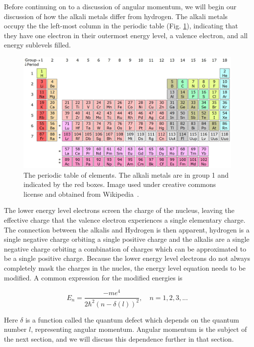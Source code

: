 \documentclass[12pt]{article}
\begin{document}
		Before continuing on to a discussion of angular momentum, 
		we will begin our discussion of how the alkali metals differ
		from hydrogen. The alkali metals occupy the the left-most
		column in the periodic table (Fig. \ref{periodicTable}), 
		indicating that they have one
		electron in their outermost energy level, a valence electron,
		and all energy sublevels filled. 
		\begin{figure}[ht]
			\centering
			\includegraphics[width=\textwidth]{periodicTable}
			\caption{\label{periodicTable}The periodic table 
				of elements. The alkali metals 
			are in group 1 and indicated by the red boxes. Image
			used under creative commons license and obtained
			from Wikipedia~\cite{periodicWiki}.}
		\end{figure}
		The lower energy level
		electrons screen the charge of the nucleus, leaving the effective
		charge that the valence electron experiences 
        a single elementary charge. The connection between the alkalis
		and Hydrogen is then apparent, hydrogen is a single negative charge
		orbiting a single positive charge and the alkalis are a single
		negative charge orbiting a combination of charges which 
		can be approximated to be a single positive charge.
        Because the lower energy level electrons do not always completely
		mask the charges in the nucles, the energy level equation 
		needs to be modified. A common
        expression for the modified energies is

		\begin{equation}\label{modEnergy}
            E_n=\frac{-me^4}{2\hbar^2(n-\delta(l))^2},\quad n=1,2,3,...
		\end{equation}

        Here $\delta$ is a function called the quantum defect which
        depends on the quantum number $l$, representing angular momentum.
        Angular momentum is the subject of the next section, and we 
        will discuss this dependence further in that section.
\end{document}
